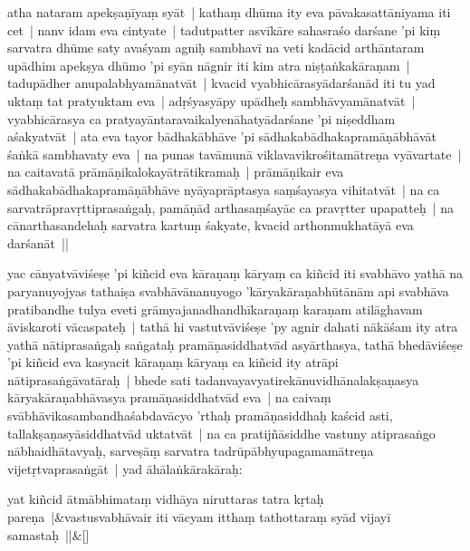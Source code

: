 \documentclass[article,12pt,a4paper]{memoir}
\begin{document}
	  \pstart atha nataram apekṣaṇīyaṃ syāt | \label{sarit__ratnakīrtinibandhāvali__126671}kathaṃ dhūma ity eva pāvakasattāniyama iti cet | nanv idam eva cintyate | tadutpatter asvīkāre sahasraśo darśane 'pi kiṃ sarvatra dhūme saty avaśyam agniḥ sambhavī na veti\label{sarit__ratnakīrtinibandhāvali__126898} kadācid arthāntaram upādhim apekṣya dhūmo 'pi syān nāgnir iti kim atra niṣṭaṅkakāraṇam | tadupādher anupalabhyamānatvāt | kvacid vyabhicārasyādarśanād iti tu yad uktaṃ tat pratyuktam eva | adṛśyasyāpy upādheḥ sambhāvyamānatvāt | vyabhicārasya ca pratyayāntaravaikalyenāhatyādarśane 'pi niṣeddham aśakyatvāt | ata eva tayor bādhakābhāve 'pi sādhakabādhakapramāṇābhāvāt śaṅkā sambhavaty eva | na punas tavāmunā viklavavikrośitamātreṇa vyāvartate | na caitavatā prāmāṇikalokayātrātikramaḥ | prāmāṇikair eva sādhakabādhakapramāṇābhāve nyāyaprāptasya saṃśayasya vihitatvāt | na ca sarvatrāpravṛttiprasaṅgaḥ, pamāṇād arthasaṃśayāc ca pravṛtter upapatteḥ | na cānarthasandehaḥ sarvatra kartuṃ śakyate, kvacid arthonmukhatāyā eva darśanāt ||
	\pend
      

	  \pstart yac cānyatvāviśeṣe 'pi kiñcid eva kāraṇaṃ kāryaṃ ca kiñcid iti svabhāvo yathā na paryanuyojyas tathaiṣa svabhāvānanuyogo 'kāryakāraṇabhūtā\leavevmode{}nām api svabhāva pratibandhe tulya eveti grāmyajanadhandhīkaraṇaṃ karaṇam atilāghavam āviskaroti vācaspateḥ | tathā hi vastutvāviśeṣe 'py agnir dahati nākāśam ity atra yathā nātiprasaṅgaḥ saṅgataḥ pramāṇasiddhatvād asyārthasya, tathā bhedāviśeṣe 'pi kiñcid eva kasyacit kāraṇaṃ kāryaṃ ca kiñcid ity atrāpi nātiprasaṅgāvatāraḥ | bhede sati tadanvayavyatirekānuvidhānalakṣaṇasya kāryakāraṇabhāvasya pramāṇasiddhatvād eva | na caivaṃ svābhāvikasambandhaśabdavācyo 'rthaḥ pramāṇasiddhaḥ kaścid asti, tallakṣaṇasyāsiddhatvād uktatvāt | na ca pratijñāsiddhe vastuny atiprasaṅgo nābhaidhātavyaḥ, sarveṣāṃ sarvatra tadrūpābhyupagamamātreṇa vijetṛtvaprasaṅgāt | yad āhālaṅkārakāraḥ:
	\pend
      
	    
	    \stanza[\smallbreak]
	yat kiñcid ātmābhimataṃ vidhāya niruttaras tatra kṛtaḥ pareṇa |&vastusvabhāvair iti vācyam itthaṃ tathottaraṃ syād vijayī samastaḥ ||\&[\smallbreak]
\end{document}
